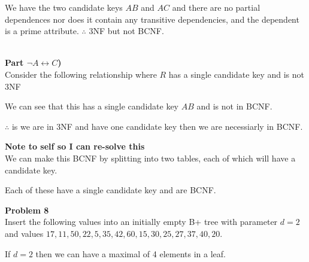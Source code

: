 \documentclass[12pt,letter]{article}
\newcommand{\problem}[1]{\vspace{3mm}\Large\textbf{{Problem
{#1}\vspace{3mm}}}\normalsize\\}
\newcommand{\ppart}[1]{\vspace{2mm}\large\textbf{\\Part
{#1})\vspace{2mm}}\normalsize\\}
\begin{document}
We have the two candidate keys $AB$ and $AC$ and there are no partial
dependences nor does it contain any transitive dependencies, and the dependent
is a prime attribute. $\therefore$ 3NF but not BCNF.

\ppart{$\neg A \leftrightarrow C$}
Consider the following relationship where $R$ has a single candidate key and is
not 3NF
\begin{figure}[ht]
    \center
\end{figure}
We can see that this has a single candidate key $AB$ and is not in BCNF.

$\therefore$ is we are in 3NF and have one candidate key then we are necessiarly
in BCNF.

\textbf{Note to self so I can re-solve this}\\
We can make this BCNF by splitting into two tables, each of which will have a
candidate key.

\begin{figure}[ht]
    \center
\end{figure}

Each of these have a single candidate key and are BCNF.

\FloatBarrier
\problem{8}
Insert the following values into an initially empty B+ tree with parameter $d=2$
and values $17, 11, 50, 22, 5, 35, 42, 60, 15, 30, 25, 27, 37, 40, 20$.

If $d=2$ then we can have a maximal of 4 elements in a leaf.
\end{document}
